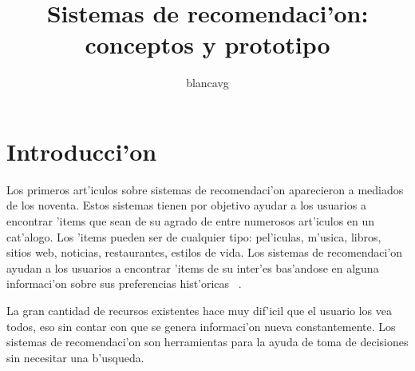 \documentclass[11pt]{article}
\begin{document}
\title{Sistemas de recomendaci'on: conceptos y prototipo}
\author{blancavg}


\maketitle
\tableofcontents
\newpage
\section{Introducci'on}

Los primeros art'iculos sobre sistemas de recomendaci'on aparecieron a mediados de los noventa. Estos sistemas tienen por objetivo ayudar a los usuarios a encontrar 'items que sean de su agrado de entre numerosos art'iculos en un cat'alogo. Los 'items pueden ser de cualquier tipo: pel'iculas, m'usica, libros, sitios web, noticias, restaurantes, estilos de vida. Los sistemas de recomendaci'on ayudan a los usuarios a encontrar 'items de su inter'es bas'andose en alguna informaci'on sobre sus preferencias hist'oricas ~\cite{start:candillier09}.

La gran cantidad de recursos existentes hace muy dif'icil que el usuario los vea todos, eso sin contar con que se genera informaci'on nueva constantemente. Los sistemas de recomendaci'on son herramientas para la ayuda de toma de decisiones sin necesitar una b'usqueda.
\end{document}
